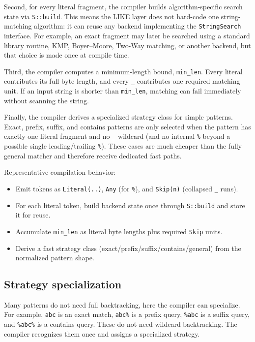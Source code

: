 \documentclass[11pt]{article}
\begin{document}
Second, for every literal fragment, the compiler builds algorithm-specific search state via \texttt{S::build}. This means the LIKE layer does not hard-code one string-matching algorithm: it can reuse any backend implementing the \texttt{StringSearch} interface. For example, an exact fragment may later be searched using a standard library routine, KMP, Boyer--Moore, Two-Way matching, or another backend, but that choice is made once at compile time.

Third, the compiler computes a minimum-length bound, \texttt{min\_len}. Every literal contributes its full byte length, and every \texttt{\_} contributes one required matching unit. If an input string is shorter than \texttt{min\_len}, matching can fail immediately without scanning the string.

Finally, the compiler derives a specialized strategy class for simple patterns. Exact, prefix, suffix, and contains patterns are only selected when the pattern has exactly one literal fragment and no \texttt{\_} wildcard (and no internal \texttt{\%} beyond a possible single leading/trailing \texttt{\%}). These cases are much cheaper than the fully general matcher and therefore receive dedicated fast paths.

Representative compilation behavior:
\begin{itemize}
    \item Emit tokens as \texttt{Literal(..)}, \texttt{Any} (for \texttt{\%}), and \texttt{Skip(n)} (collapsed \texttt{\_} runs).
    \item For each literal token, build backend state once through \texttt{S::build} and store it for reuse.
    \item Accumulate \texttt{min\_len} as literal byte lengths plus required \texttt{Skip} units.
    \item Derive a fast strategy class (exact/prefix/suffix/contains/general) from the normalized pattern shape.
\end{itemize}

\subsection{Strategy specialization}

Many patterns do not need full backtracking, here the compiler can specialize. For example, \texttt{abc} is an exact match, \texttt{abc\%} is a prefix query, \texttt{\%abc} is a suffix query, and \texttt{\%abc\%} is a contains query. These do not need wildcard backtracking. The compiler recognizes them once and assigns a specialized strategy.
\end{document}

